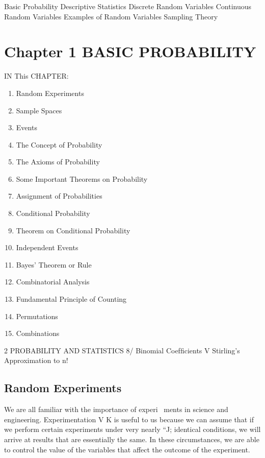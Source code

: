 

Basic Probability
Descriptive Statistics
Discrete Random Variables
Continuous Random Variables
Examples of Random Variables
Sampling Theory



\section*{Chapter 1 BASIC PROBABILITY}

IN This CHAPTER:

\begin{enumerate}
\item Random Experiments
\item Sample Spaces
\item Events
\item The Concept of Probability
\item The Axioms of Probability
\item Some Important Theorems on Probability
\item Assignment of Probabilities
\item Conditional Probability
\item Theorem on Conditional Probability
\item Independent Events
\item Bayes’ Theorem or Rule
\item Combinatorial Analysis
\item Fundamental Principle of Counting
\item Permutations
\item Combinations
\end{enumerate}
\newpage


2 PROBABILITY AND STATISTICS
8/ Binomial Coefﬁcients
V Stirling’s Approximation to n!
\subsection*{Random Experiments}
We are all familiar with the importance of experi~
ments in science and engineering. Experimentation V K
is useful to us because we can assume that if we perform certain experiments under very nearly “J; 
identical conditions, we will arrive at results that
are essentially the same. In these circumstances,
we are able to control the value of the variables
that affect the outcome of the experiment.

